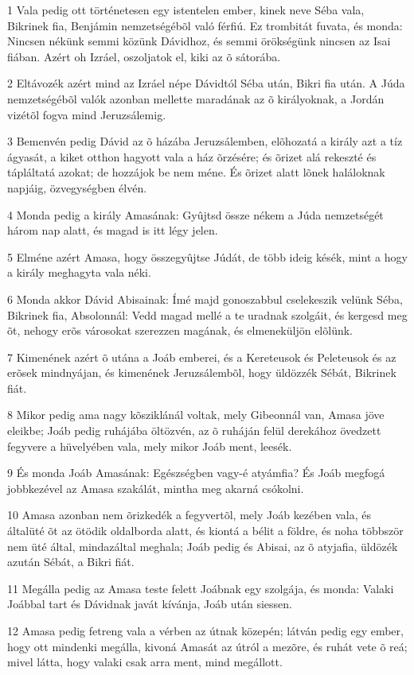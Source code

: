 \par 1 Vala pedig ott történetesen egy istentelen ember, kinek neve Séba vala, Bikrinek fia, Benjámin nemzetségébõl való férfiú. Ez trombitát fuvata, és monda: Nincsen nékünk semmi közünk Dávidhoz, és semmi örökségünk nincsen az Isai fiában. Azért oh Izráel, oszoljatok el, kiki az õ sátorába.
\par 2 Eltávozék azért mind az Izráel népe Dávidtól Séba után, Bikri fia után. A Júda nemzetségébõl valók azonban mellette maradának az õ királyoknak, a Jordán vizétõl fogva mind Jeruzsálemig.
\par 3 Bemenvén pedig Dávid az õ házába Jeruzsálemben, elõhozatá a király azt a tíz ágyasát, a kiket otthon hagyott vala a ház õrzésére; és õrizet alá rekeszté és tápláltatá azokat; de hozzájok be nem méne. És õrizet alatt lõnek haláloknak napjáig, özvegységben élvén.
\par 4 Monda pedig a király Amasának: Gyûjtsd össze nékem a Júda nemzetségét három nap alatt, és magad is itt légy jelen.
\par 5 Elméne azért Amasa, hogy összegyûjtse Júdát, de több ideig késék, mint a hogy a király meghagyta vala néki.
\par 6 Monda akkor Dávid Abisainak: Ímé majd gonoszabbul cselekeszik velünk Séba, Bikrinek fia, Absolonnál: Vedd magad mellé a te uradnak szolgáit, és kergesd meg õt, nehogy erõs városokat szerezzen magának, és elmeneküljön elõlünk.
\par 7 Kimenének azért õ utána a Joáb emberei, és a Kereteusok  és Peleteusok és az erõsek mindnyájan, és kimenének Jeruzsálembõl, hogy üldözzék Sébát, Bikrinek fiát.
\par 8 Mikor pedig ama nagy kõsziklánál voltak, mely Gibeonnál van, Amasa jöve eleikbe; Joáb pedig ruhájába öltözvén, az õ ruháján felül derekához övedzett fegyvere a hüvelyében vala, mely mikor Joáb ment, leesék.
\par 9 És monda Joáb Amasának: Egészségben vagy-é atyámfia? És Joáb megfogá jobbkezével az Amasa szakálát, mintha meg akarná  csókolni.
\par 10 Amasa azonban nem õrizkedék a fegyvertõl, mely Joáb kezében vala, és általüté õt az ötödik oldalborda alatt, és kiontá a bélit a földre, és noha többször nem üté által, mindazáltal meghala; Joáb pedig és Abisai, az õ atyjafia, üldözék azután Sébát, a Bikri fiát.
\par 11 Megálla pedig az Amasa teste felett Joábnak egy szolgája, és monda: Valaki Joábbal tart és Dávidnak javát kívánja, Joáb után siessen.
\par 12 Amasa pedig fetreng vala a vérben az útnak közepén; látván pedig egy ember, hogy ott mindenki megálla, kivoná Amasát az útról a mezõre, és ruhát vete õ reá; mivel látta, hogy valaki csak arra ment, mind megállott.
